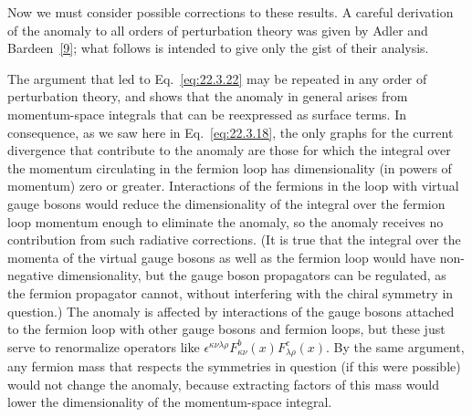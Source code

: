 Now we must consider possible corrections to these results. A careful
derivation of the anomaly to all orders of perturbation theory was given by
Adler and Bardeen~\hyperref[ch22-ref-9]{[9]}; what follows is intended to
give only the gist of their analysis.

The argument that led to Eq.~\eqref{eq:22.3.22} may be repeated in any
order of perturbation theory, and shows that the anomaly in general arises
from momentum-space integrals that can be reexpressed as surface terms. In
consequence, as we saw here in Eq.~\eqref{eq:22.3.18}, the only graphs for
the current divergence that contribute to the anomaly are those for which
the integral over the momentum circulating in the fermion loop has
dimensionality (in powers of momentum) zero or greater. Interactions of the
fermions in the loop with virtual gauge bosons would reduce the
dimensionality of the integral over the fermion loop momentum enough to
eliminate the anomaly, so the anomaly receives no contribution from such
radiative corrections. (It is true that the integral over the momenta of
the virtual gauge bosons as well as the fermion loop would have
non-negative dimensionality, but the gauge boson propagators can be
regulated, as the fermion propagator cannot, without interfering with the
chiral symmetry in question.) The anomaly is affected by interactions of
the gauge bosons attached to the fermion loop with other gauge bosons and
fermion loops, but these just serve to renormalize operators like
$\epsilon^{\kappa\nu\lambda\rho}F_{\kappa\nu}^{b}(x)
F_{\lambda\rho}^{c}(x)$. By the same argument, any fermion mass that
respects the symmetries in question (if this were possible) would not
change the anomaly, because extracting factors of this mass would lower
the dimensionality of the momentum-space integral.

